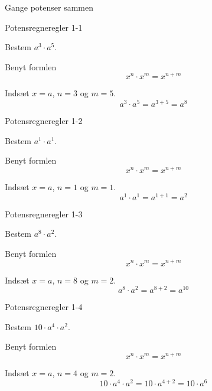 \documentclass{article}
\begin{document}
\tableofcontents
\newpage
Gange potenser sammen
\begin{exercise}{Potensregneregler 1-1}

Bestem $a^3 \cdot a^5$.


\hint

Benyt formlen
\[
x^n \cdot x^m = x^{n+m}
\]

\hint

Indsæt $x=a$, $n=3$ og $m=5$.
\[
a^3 \cdot a^5 = a^{3+5} = a^8
\]

\end{exercise}

\newpage

\begin{exercise}{Potensregneregler 1-2}
	
	Bestem $a^1 \cdot a^1$.
	
	
	\hint
	
	Benyt formlen
	\[
	x^n \cdot x^m = x^{n+m}
	\]
	
	\hint
	
	Indsæt $x=a$, $n=1$ og $m=1$.
	\[
	a^1 \cdot a^1 = a^{1+1} = a^2
	\]
	
\end{exercise}

\newpage

\begin{exercise}{Potensregneregler 1-3}
	
	Bestem $a^8 \cdot a^2$.
	
	
	\hint
	
	Benyt formlen
	\[
	x^n \cdot x^m = x^{n+m}
	\]
	
	\hint
	
	Indsæt $x=a$, $n=8$ og $m=2$.
	\[
	a^8 \cdot a^2 = a^{8+2} = a^{10}
	\]
	
\end{exercise}

\newpage

\begin{exercise}{Potensregneregler 1-4}
	
	Bestem $10 \cdot a^4 \cdot a^2$.
	
	
	\hint
	
	Benyt formlen
	\[
	x^n \cdot x^m = x^{n+m}
	\]
	
	\hint
	
	Indsæt $x=a$, $n=4$ og $m=2$.
	\[
	10 \cdot a^4 \cdot a^2 = 10 \cdot a^{4+2} =  10 \cdot a^6
	\]
	
\end{exercise}
\end{document}
